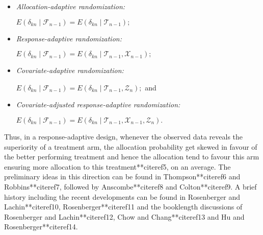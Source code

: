 \begin{itemize}
\item {\textit{Allocation-adaptive randomization:}
 \begin{center}
 $E(\delta_{kn}\mid \mathcal{F}_{n-1})=E(\delta_{kn}\mid \mathcal{T}_{n-1});$
\end{center}
}
\item{\textit{Response-adaptive randomization:}
\begin{center}
$E(\delta_{kn}\mid \mathcal{F}_{n-1})=E(\delta_{kn}\mid \mathcal{T}_{n-1},\mathcal{X}_{n-1});$
\end{center}
}
\item{\textit{Covariate-adaptive randomization:}
\begin{center}
 $E(\delta_{kn}\mid \mathcal{F}_{n-1})=E(\delta_{kn}\mid \mathcal{T}_{n-1},\mathcal{Z}_{n});$ and
\end{center}
}
\item{\textit{Covariate-adjusted response-adaptive randomization:}
\begin{center}
$E(\delta_{kn}\mid \mathcal{F}_{n-1})=E(\delta_{kn}\mid \mathcal{T}_{n-1},\mathcal{X}_{n-1},\mathcal{Z}_{n}).$
\end{center}
}
\end{itemize}
\noindent Thus, in a response-adaptive design, whenever the observed data reveals the superiority of a treatment arm, the allocation probability get skewed in favour of the better performing treatment and hence  the allocation tend to favour this arm ensuring more allocation to this treatment**citeref{5}, on an average. The preliminary ideas in this direction can be found in Thompson**citeref{6} and Robbins**citeref{7}, followed by Anscombe**citeref{8} and Colton**citeref{9}. A brief history including the recent developments can be found in Rosenberger and Lachin**citeref{10}, Rosenberger**citeref{11} and the booklength discussions  of Rosenberger and Lachin**citeref{12}, Chow and Chang**citeref{13} and Hu and Rosenberger**citeref{14}.

